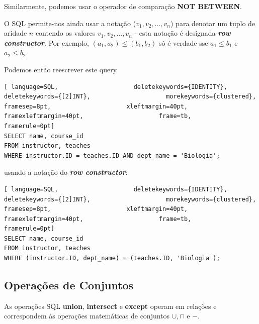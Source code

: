 \documentclass[oneside]{book}
\theoremstyle{definition}
\begin{document}
Similarmente, podemos usar o operador de comparação \textbf{NOT BETWEEN}.

O SQL permite-nos ainda usar a notação ($v_{1}, v_{2}, ..., v_{n}$) para denotar um tuplo de aridade $n$ contendo os valores $v_1, v_2, ..., v_n$ - esta notação é designada \textbf{\textit{row constructor}}. Por exemplo, $(a_1, a_2) \leq (b_1, b_2)$ só é verdade sse $a_1 \leq b_1$ e $a_2 \leq b_2$.

Podemos então reescrever este query
\begin{lstlisting}[ language=SQL,                     deletekeywords={IDENTITY},                     deletekeywords={[2]INT},                     morekeywords={clustered},                     framesep=8pt,                     xleftmargin=40pt,                     framexleftmargin=40pt,                     frame=tb,                     framerule=0pt]
SELECT name, course_id
FROM instructor, teaches
WHERE instructor.ID = teaches.ID AND dept_name = 'Biologia';
\end{lstlisting}
usando a notação do \textbf{\textit{row constructor}}:
\begin{lstlisting}[ language=SQL,                     deletekeywords={IDENTITY},                     deletekeywords={[2]INT},                     morekeywords={clustered},                     framesep=8pt,                     xleftmargin=40pt,                     framexleftmargin=40pt,                     frame=tb,                     framerule=0pt]
SELECT name, course_id
FROM instructor, teaches
WHERE (instructor.ID, dept_name) = (teaches.ID, 'Biologia');
\end{lstlisting}

\subsection{Operações de Conjuntos}
As operações SQL \textbf{union}, \textbf{intersect} e \textbf{except} operam em relações e correspondem às operações matemáticas de conjuntos $\cup, \cap$ e $-$.
\end{document}
